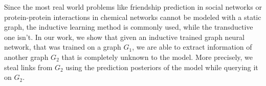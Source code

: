      Since the most real world problems like friendship prediction in social networks or protein-protein interactions in chemical networks cannot be modeled with a static graph, the inductive learning method is commonly used, while the transductive one isn't.
      In our work, we show that given an inductive trained graph neural network, that was trained on a graph $G_1$, we are able to extract information of another graph $G_2$ that is completely unknown to the model.
      More precisely, we steal links from $G_2$ using the prediction posteriors of the model while querying it on $G_2$.


